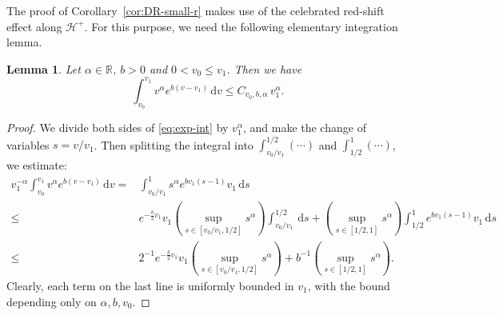 \documentclass[10pt, reqno]{amsart}
\newtheorem{lemma}[theorem]{Lemma}
\theoremstyle{definition}
\theoremstyle{remark}
\theoremstyle{conjecture}
\numberwithin{equation}{section}
\newcommand{\ud}{\mathrm{d}}
\newcommand{\0}{\emptyset}
\newcommand{\alp}{\alpha}
\newcommand{\bbR}{\mathbb R}
\newcommand{\calH}{\mathcal H}
\newcommand{\EH}{\calH^{+}}
\begin{document}
The proof of Corollary~\ref{cor:DR-small-r} makes use of the celebrated red-shift effect along $\EH$. For this purpose, we need the following  elementary integration lemma. 
\begin{lemma} \label{lem:exp-int}
Let $\alp \in \bbR$, $b > 0$ and $0 < v_{0} \leq v_{1}$. Then we have
\begin{equation} \label{eq:exp-int}
	\int_{v_{0}}^{v_{1}} v^{\alp} e^{b (v - v_{1})} \, \ud v \leq C_{v_{0}, b, \alp} \, v_{1}^{\alp}.
\end{equation}
\end{lemma}
\begin{proof}
We divide both sides of \eqref{eq:exp-int} by $v_{1}^{\alp}$, and make the change of variables $s = v / v_{1}$. Then splitting the integral into $\int_{v_{0}/v_{1}}^{1/2}(\cdots)$ and $\int_{1/2}^{1}(\cdots)$, we estimate:
\begin{align*}
	v_{1}^{-\alp} \int_{v_{0}}^{v_{1}} v^{\alp} e^{b (v - v_{1})} \, \ud v
	= & \int_{v_{0}/v_{1}}^{1} s^{\alp} e^{b v_{1} (s - 1)} v_{1} \, \ud s  \\
	\leq & e^{-\frac{b}{2} v_{1}} v_{1} \left(\sup_{s \in [v_{0} / v_{1}, 1/2]} s^{\alp} \right)\int_{v_{0}/v_{1}}^{1/2} \, \ud s
		+ \left( \sup_{s \in [1/2, 1]} s^{\alp} \right) \int_{1/2}^{1} e^{b v_{1}(s - 1)} v_{1} \, \ud s \\
	\leq & 2^{-1} e^{-\frac{b}{2} v_{1}} v_{1} \left(\sup_{s \in [v_{0} / v_{1}, 1/2]} s^{\alp} \right)
		+ b^{-1} \left( \sup_{s \in [1/2, 1]} s^{\alp} \right) .
\end{align*}
Clearly, each term on the last line is uniformly bounded in $v_{1}$, with the bound depending only on $\alp, b, v_{0}$. \qedhere
\end{proof}
\end{document}

